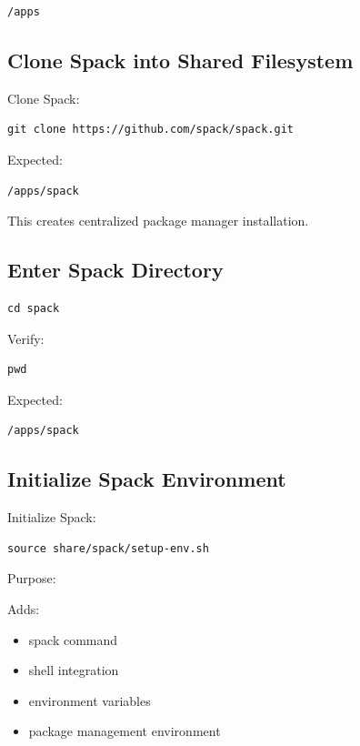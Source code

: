 \documentclass[11pt]{article}
\begin{document}
\begin{verbatim}
/apps
\end{verbatim}
\subsection{Clone Spack into Shared Filesystem}
\label{sec:orgb1d1d15}

Clone Spack:

\begin{verbatim}
git clone https://github.com/spack/spack.git
\end{verbatim}

Expected:

\begin{verbatim}
/apps/spack
\end{verbatim}

This creates centralized package manager installation.
\subsection{Enter Spack Directory}
\label{sec:orgb67f5bc}

\begin{verbatim}
cd spack
\end{verbatim}

Verify:

\begin{verbatim}
pwd
\end{verbatim}

Expected:

\begin{verbatim}
/apps/spack
\end{verbatim}
\subsection{Initialize Spack Environment}
\label{sec:orgd74c894}

Initialize Spack:

\begin{verbatim}
source share/spack/setup-env.sh
\end{verbatim}

Purpose:

Adds:

\begin{itemize}
\item spack command
\item shell integration
\item environment variables
\item package management environment
\end{itemize}
\end{document}
